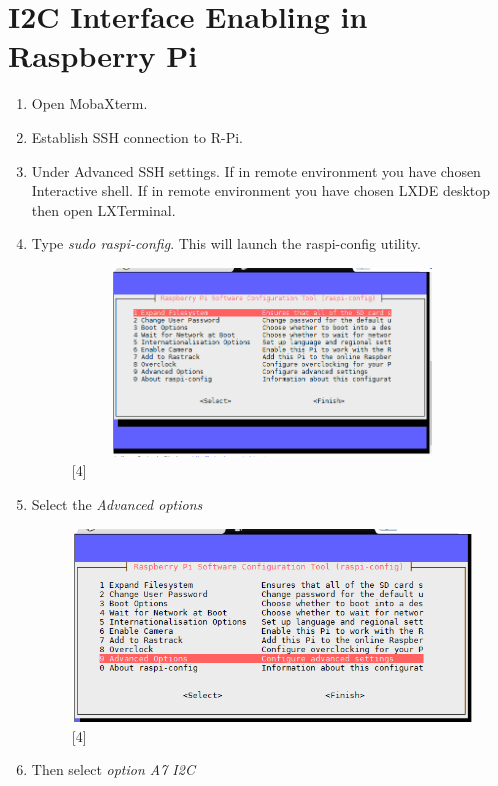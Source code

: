 \documentclass[a4paper,12pt,oneside]{book}
\begin{document}
\section{I2C Interface Enabling in Raspberry Pi}
\begin{enumerate}
		\item Open MobaXterm. 
		\item Establish SSH connection to R-Pi.
		\item Under Advanced SSH settings.
		\subitem If in remote environment you have chosen Interactive shell.
		\subitem If in remote environment you have chosen LXDE desktop then open LXTerminal.
		
		\item  Type \textit{sudo raspi-config}. This will launch the raspi-config utility.
		
		\begin{figure}[h!]
			\includegraphics[width=11cm,height=5cm]{i2c_1}
			\centering
			\caption{[4]}
			\end{figure}
		\item Select the \textit{Advanced options}
		\begin{figure}[h!]
			\includegraphics[scale=0.6]{i2c_2}
			\centering
			\caption{[4]}
		\end{figure} 
		\item Then select \textit{option A7 I2C} 
		\newline
		\begin{figure}[h!]

\end{figure}
\end{enumerate}
\end{document}

